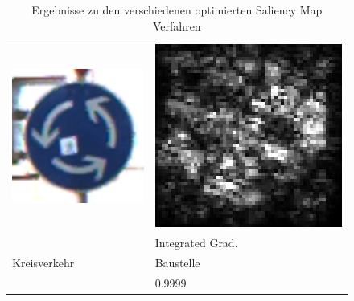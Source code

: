 \begin{table}
\begin{tabular}{p{4.5cm}p{4.5cm}}
		\includegraphics[height=4.4cm]{Images/AnPe/04709} &\includegraphics[width=\linewidth]{Images/AnPe/04709_int_grad}  \\
		& Integrated Grad.\\
		Kreisverkehr &Baustelle \\
		& 0.9999
	\end{tabular}
	\caption{Ergebnisse zu den verschiedenen optimierten Saliency Map Verfahren}
\label{tab:sal2}
\end{table}

